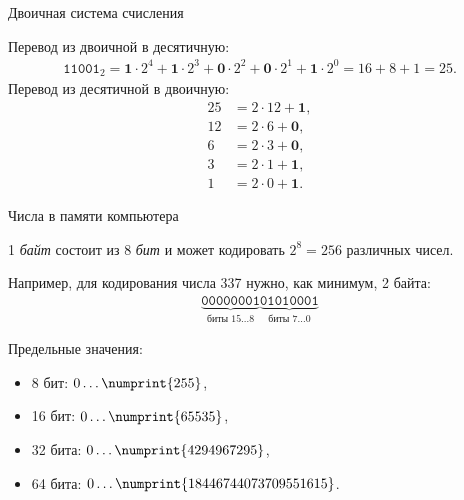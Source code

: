 \documentclass{beamer}
\newcommand{\num}[1]{\numprint{#1}}
\newcommand{\pcnum}[1]{\ensuremath{\mathtt{#1}}}
\newcommand{\bin}[1]{\pcnum{#1}_2}
\begin{document}
\begin{frame}{Двоичная система счисления}

  Перевод из двоичной в десятичную:
  \begin{gather*}
    \bin{11001} = \mathbf{1} \cdot 2^4 + \mathbf{1} \cdot 2^3 +
                  \mathbf{0} \cdot 2^2 + \mathbf{0} \cdot 2^1 +
                  \mathbf{1} \cdot 2^0 = 16 + 8 + 1 = 25.
  \end{gather*}
  Перевод из десятичной в двоичную:
  \begin{align*}
    25 &= 2 \cdot 12 + \mathbf{1}, \\
    12 &= 2 \cdot 6 + \mathbf{0}, \\
    6 &= 2 \cdot 3 + \mathbf{0}, \\
    3 &= 2 \cdot 1 + \mathbf{1}, \\
    1 &= 2 \cdot 0 + \mathbf{1}.
  \end{align*}

\end{frame}

\begin{frame}{Числа в памяти компьютера}

  1 \emph{байт} состоит из 8 \emph{бит} и может кодировать $2^8 = 256$
  различных чисел.

  Например, для кодирования числа 337 нужно, как минимум, 2 байта:
  \begin{gather*}
    \underbrace{\pcnum{00000001}}_{\text{биты } 15 \ldots 8}
    \underbrace{\pcnum{01010001}}_{\text{биты } 7 \ldots 0}
  \end{gather*}

  Предельные значения:
  \begin{itemize}
    \item 8 бит: $0 \ldots \num{255}$,
    \item 16 бит: $0 \ldots \num{65535}$,
    \item 32 бита: $0 \ldots \num{4294967295}$,
    \item 64 бита: $0 \ldots \num{18446744073709551615}$.
  \end{itemize}
\end{frame}
\end{document}

